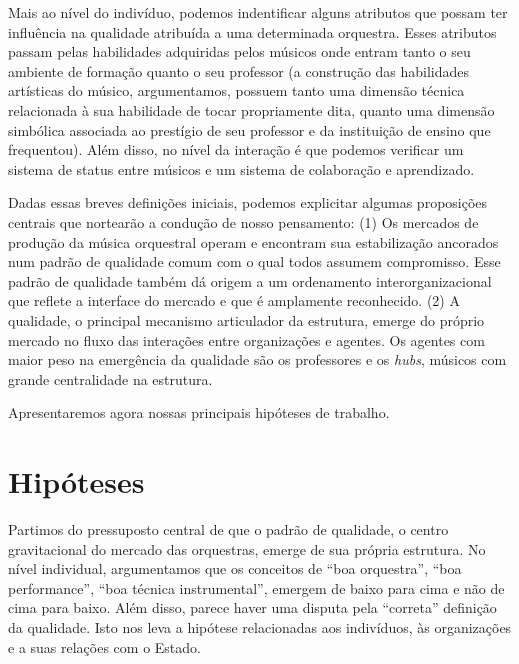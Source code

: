 \documentclass[a4paper, 12pt, openright, oneside, german, french, english, brazil]{abntex2}
\begin{document}
	Mais ao nível do indivíduo, podemos indentificar alguns atributos que possam ter influência na qualidade atribuída a uma determinada orquestra. Esses atributos passam pelas habilidades adquiridas pelos músicos onde entram tanto o seu ambiente de formação quanto o seu professor (a construção das habilidades artísticas do músico, argumentamos, possuem tanto uma dimensão técnica relacionada à sua habilidade de tocar propriamente dita, quanto uma dimensão simbólica associada ao prestígio de seu professor e da instituição de ensino que frequentou). Além disso, no nível da interação é que podemos verificar um sistema de status entre músicos e um sistema de colaboração e aprendizado.

	Dadas essas breves definições iniciais, podemos explicitar algumas proposições centrais que nortearão a condução de nosso pensamento: (1) Os mercados de produção da música orquestral operam e encontram sua estabilização ancorados num padrão de qualidade comum com o qual todos assumem compromisso. Esse padrão de qualidade também dá origem a um ordenamento interorganizacional que reflete a interface do mercado e que é amplamente reconhecido. (2) A qualidade, o principal mecanismo articulador da estrutura, emerge do próprio mercado no fluxo das interações entre organizações e agentes. Os agentes com maior peso na emergência da qualidade são os professores e os \textit{hubs}, músicos com grande centralidade na estrutura.

	Apresentaremos agora nossas principais hipóteses de trabalho.
	
	\section{Hipóteses}
	
	\newtheorem{hip}{Hipótese}

	
	Partimos do pressuposto central de que o padrão de qualidade, o centro gravitacional do mercado das orquestras, emerge de sua própria estrutura. No nível individual, argumentamos que os conceitos de ``boa orquestra'', ``boa performance'', ``boa técnica instrumental'', emergem de baixo para cima e não de cima para baixo. Além disso, parece haver uma disputa pela ``correta'' definição da qualidade. Isto nos leva a hipótese relacionadas aos indivíduos, às organizações e a suas relações com o Estado.
	
\end{document}

